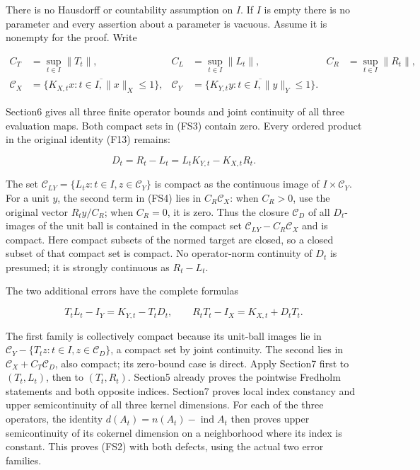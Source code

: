 \documentclass[
  11pt,
]{article}
\begin{document}
There is no Hausdorff or countability assumption on \(I\). If \(I\) is
empty there is no parameter and every assertion about a parameter is
vacuous. Assume it is nonempty for the proof. Write

\[
 \begin{aligned}
 C_T&=\sup_{t\in I}\|T_t\|,& C_L&=\sup_{t\in I}\|L_t\|,&
 C_R&=\sup_{t\in I}\|R_t\|,\\
 \mathcal C_X&=\overline{\{K_{X,t}x:t\in I,\|x\|_X\leq1\}},&
 \mathcal C_Y&=\overline{\{K_{Y,t}y:t\in I,\|y\|_Y\leq1\}}.
 \end{aligned}                                                \tag{FS3}
\]

Section6 gives all three finite operator bounds and joint continuity of
all three evaluation maps. Both compact sets in (FS3) contain zero.
Every ordered product in the original identity (F13) remains:

\[
 D_t=R_t-L_t=L_tK_{Y,t}-K_{X,t}R_t.                            \tag{FS4}
\]

The set \(\mathcal C_{LY}=\{L_tz:t\in I,z\in\mathcal C_Y\}\) is compact
as the continuous image of \(I\times\mathcal C_Y\). For a unit \(y\),
the second term in (FS4) lies in \(C_R\mathcal C_X\): when \(C_R>0\),
use the original vector \(R_ty/C_R\); when \(C_R=0\), it is zero. Thus
the closure \(\mathcal C_D\) of all \(D_t\)-images of the unit ball is
contained in the compact set \(\mathcal C_{LY}-C_R\mathcal C_X\) and is
compact. Here compact subsets of the normed target are closed, so a
closed subset of that compact set is compact. No operator-norm
continuity of \(D_t\) is presumed; it is strongly continuous as
\(R_t-L_t\).

The two additional errors have the complete formulas

\[
 T_tL_t-I_Y=K_{Y,t}-T_tD_t,\qquad
 R_tT_t-I_X=K_{X,t}+D_tT_t.                                   \tag{FS5}
\]

The first family is collectively compact because its unit-ball images
lie in \(\mathcal C_Y-\{T_tz:t\in I,z\in\mathcal C_D\}\), a compact set
by joint continuity. The second lies in
\(\mathcal C_X+C_T\mathcal C_D\), also compact; its zero-bound case is
direct. Apply Section7 first to \((T_t,L_t)\), then to \((T_t,R_t)\).
Section5 already proves the pointwise Fredholm statements and both
opposite indices. Section7 proves local index constancy and upper
semicontinuity of all three kernel dimensions. For each of the three
operators, the identity \(d(A_t)=n(A_t)-\operatorname{ind}A_t\) then
proves upper semicontinuity of its cokernel dimension on a neighborhood
where its index is constant. This proves (FS2) with both defects, using
the actual two error families.
\end{document}
